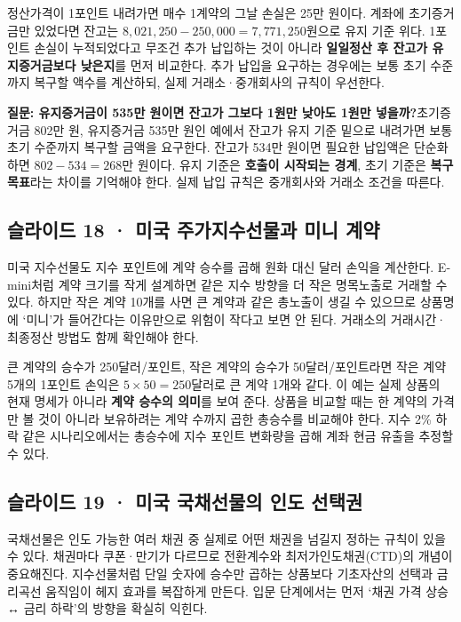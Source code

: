 \documentclass[11pt,a4paper]{article}
\begin{document}
정산가격이 1포인트 내려가면 매수 1계약의 그날 손실은 25만 원이다. 계좌에 초기증거금만 있었다면 잔고는 $8{,}021{,}250-250{,}000=7{,}771{,}250$원으로 유지 기준 위다. 1포인트 손실이 누적되었다고 무조건 추가 납입하는 것이 아니라 \textbf{일일정산 후 잔고가 유지증거금보다 낮은지}를 먼저 비교한다. 추가 납입을 요구하는 경우에는 보통 초기 수준까지 복구할 액수를 계산하되, 실제 거래소·중개회사의 규칙이 우선한다.\par

\par\medskip\noindent\textbf{질문: 유지증거금이 535만 원이면 잔고가 그보다 1원만 낮아도 1원만 넣을까?}\quad 초기증거금 802만 원, 유지증거금 535만 원인 예에서 잔고가 유지 기준 밑으로 내려가면 보통 초기 수준까지 복구할 금액을 요구한다. 잔고가 534만 원이면 필요한 납입액은 단순화하면 $802-534=268$만 원이다. 유지 기준은 \textbf{호출이 시작되는 경계}, 초기 기준은 \textbf{복구 목표}라는 차이를 기억해야 한다. 실제 납입 규칙은 중개회사와 거래소 조건을 따른다.\par

\subsection{슬라이드 18 · 미국 주가지수선물과 미니 계약}
미국 지수선물도 지수 포인트에 계약 승수를 곱해 원화 대신 달러 손익을 계산한다. E-mini처럼 계약 크기를 작게 설계하면 같은 지수 방향을 더 작은 명목노출로 거래할 수 있다. 하지만 작은 계약 10개를 사면 큰 계약과 같은 총노출이 생길 수 있으므로 상품명에 ‘미니’가 들어간다는 이유만으로 위험이 작다고 보면 안 된다. 거래소의 거래시간·최종정산 방법도 함께 확인해야 한다.\par

큰 계약의 승수가 250달러/포인트, 작은 계약의 승수가 50달러/포인트라면 작은 계약 5개의 1포인트 손익은 $5\times50=250$달러로 큰 계약 1개와 같다. 이 예는 실제 상품의 현재 명세가 아니라 \textbf{계약 승수의 의미}를 보여 준다. 상품을 비교할 때는 한 계약의 가격만 볼 것이 아니라 보유하려는 계약 수까지 곱한 총승수를 비교해야 한다. 지수 2\% 하락 같은 시나리오에서는 총승수에 지수 포인트 변화량을 곱해 계좌 현금 유출을 추정할 수 있다.\par

\subsection{슬라이드 19 · 미국 국채선물의 인도 선택권}
국채선물은 인도 가능한 여러 채권 중 실제로 어떤 채권을 넘길지 정하는 규칙이 있을 수 있다. 채권마다 쿠폰·만기가 다르므로 전환계수와 최저가인도채권(CTD)의 개념이 중요해진다. 지수선물처럼 단일 숫자에 승수만 곱하는 상품보다 기초자산의 선택과 금리곡선 움직임이 헤지 효과를 복잡하게 만든다. 입문 단계에서는 먼저 ‘채권 가격 상승 ↔ 금리 하락’의 방향을 확실히 익힌다.\par
\end{document}
